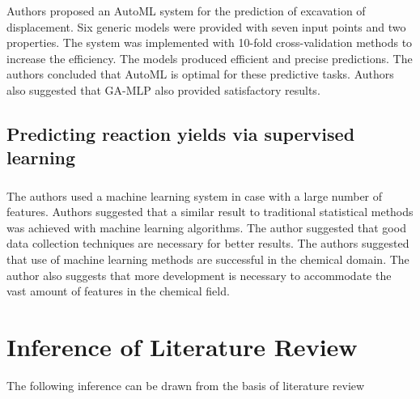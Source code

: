 Authors proposed an AutoML system for the prediction of excavation of displacement. Six generic models were provided with seven input points and two properties. The system was implemented with 10-fold cross-validation methods to increase the efficiency. The models produced efficient and precise predictions. The authors concluded that AutoML is optimal for these predictive tasks. Authors also suggested that GA-MLP also provided satisfactory results.

\subsection{Predicting reaction yields via supervised learning}
\subsubsection{\citeauthor*{ref_paper_10} \citeyearpar{ref_paper_10}}

The authors used a machine learning system in case with a large number of features. Authors suggested that a similar result to traditional statistical methods was achieved with machine learning algorithms. The author suggested that good data collection techniques are necessary for better results. The authors suggested that use of machine learning methods are successful in the chemical domain. The author also suggests that more development is necessary to accommodate the vast amount of features in the chemical field.

\section{Inference of Literature Review} \label{sec:inference _of_literature_review}

The following inference can be drawn from the basis of literature review

\vspace{-1.5em}

